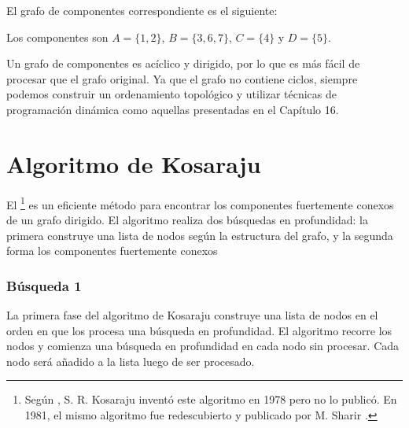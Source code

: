 El grafo de componentes correspondiente es el siguiente:
\begin{center}
\end{center}
Los componentes son $A=\{1,2\}$, $B=\{3,6,7\}$, $C=\{4\}$ y $D=\{5\}$.

Un grafo de componentes es acíclico y dirigido, por lo que es más fácil
de procesar que el grafo original. Ya que el grafo no contiene ciclos,
siempre podemos construir un ordenamiento topológico y utilizar
técnicas de programación dinámica como aquellas presentadas en el
Capítulo 16.

\section{Algoritmo de Kosaraju}


El \footnote{Según \cite{aho83},
    S. R. Kosaraju inventó este algoritmo en 1978 pero no lo publicó.
    En 1981, el mismo algoritmo fue redescubierto y publicado por
    M. Sharir \cite{sha81}.} es un eficiente método para encontrar
los componentes fuertemente conexos de un grafo dirigido.
El algoritmo realiza dos búsquedas en profundidad: la primera construye
una lista de nodos según la estructura del grafo, y la segunda forma los
componentes fuertemente conexos

\subsubsection{Búsqueda 1}

La primera fase del algoritmo de Kosaraju construye una lista de nodos
en el orden en que los procesa una búsqueda en profundidad. El algoritmo
recorre los nodos y comienza una búsqueda en profundidad en cada nodo
sin procesar. Cada nodo será añadido a la lista luego de ser procesado.


